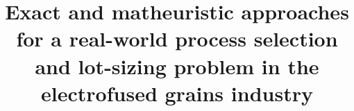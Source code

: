 \documentclass[11pt]{article}
\begin{document}
\title{Exact and matheuristic approaches for a real-world process
selection and lot-sizing problem in the electrofused grains industry}
\date{}\maketitle









\end{document}
